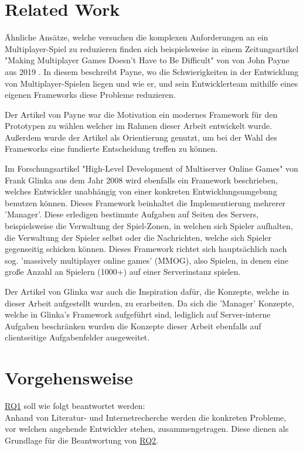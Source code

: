 \section{Related Work}

Ähnliche Ansätze, welche versuchen die komplexen Anforderungen an ein Multiplayer-Spiel zu reduzieren finden sich beispielsweise in einem Zeitungsartikel "Making Multiplayer Games Doesn’t Have to Be Difficult" von von John Payne aus 2019  \cite{Payne.18.09.2019}. In diesem beschreibt Payne, wo die Schwierigkeiten in der Entwicklung von Multiplayer-Spielen liegen und wie er, und sein Entwicklerteam mithilfe eines eigenen Frameworks diese Probleme reduzieren.

Der Artikel von Payne war die Motivation ein modernes Framework für den Prototypen zu wählen welcher im Rahmen dieser Arbeit entwickelt wurde. Außerdem wurde der Artikel als Orientierung genutzt, um bei der Wahl des Frameworks eine fundierte Entscheidung treffen zu können.

Im Forschungsartikel "High-Level Development of Multiserver Online Games" von Frank Glinka aus dem Jahr 2008 \cite{Glinka.2008} wird ebenfalls ein Framework beschrieben, welches Entwickler unabhängig von einer konkreten Entwicklungsumgebung benutzen können. Dieses Framework beinhaltet die Implementierung mehrerer 'Manager'. Diese erledigen bestimmte Aufgaben auf Seiten des Servers, beispielsweise die Verwaltung der Spiel-Zonen, in welchen sich Spieler aufhalten, die Verwaltung der Spieler selbst oder die Nachrichten, welche sich Spieler gegenseitig schicken können. Dieses Framework richtet sich hauptsächlich nach sog. 'massively multiplayer online games' (MMOG), also Spielen, in denen eine große Anzahl an Spielern (1000+) auf einer Serverinstanz spielen.

Der Artikel von Glinka war auch die Inspiration dafür, die Konzepte, welche in dieser Arbeit aufgestellt wurden, zu erarbeiten. Da sich die 'Manager' Konzepte, welche in Glinka's Framework aufgeführt sind, lediglich auf Server-interne Aufgaben beschränken wurden die Konzepte dieser Arbeit ebenfalls auf clientseitige Aufgabenfelder ausgeweitet.

\section{Vorgehensweise}

\hyperref[RQ1]{RQ1} soll wie folgt beantwortet werden: \\
Anhand von Literatur- und Internetrecherche werden die konkreten Probleme, vor welchen angehende Entwickler stehen, zusammengetragen. Diese dienen als Grundlage für die Beantwortung von \hyperref[RQ2]{RQ2}.

